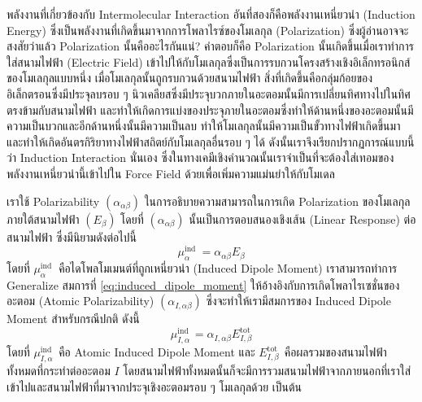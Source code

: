 พลังงานที่เกี่ยวข้องกับ Intermolecular Interaction อันที่สองก็คือพลังงานเหนี่ยวนำ (Induction Energy) ซึ่งเป็นพลังงานที่เกิดขึ้นมาจากการโพลาไรซ์ของโมเลกุล (Polarization) ซึ่งผู้อ่านอาจจะสงสัยว่าแล้ว Polarization นั้นคืออะไรกันแน่? คำตอบก็คือ Polarization นั้นเกิดขึ้นเมื่อเราทำการใส่สนามไฟฟ้า (Electric Field) เข้าไปให้กับโมเลกุลซึ่งเป็นการรบกวนโครงสร้างเชิงอิเล็กทรอนิกส์ของโมเลกุลแบบหนึ่ง เมื่อโมเลกุลนั้นถูกรบกวนด้วยสนามไฟฟ้า สิ่งที่เกิดขึ้นคือกลุ่มก้อยของอิเล็กตรอนซึ่งมีประจุลบรอบ ๆ นิวเคลียสซึ่งมีประจุบวกภายในอะตอมนั้นมีการเปลี่ยนทิศทางไปในทิศตรงข้ามกับสนามไฟฟ้า และทำให้เกิดการแบ่งของประจุภายในอะตอมซึ่งทำให้ด้านหนึ่งของอะตอมนั้นมีความเป็นบวกและอีกด้านหนึ่งนั้นมีความเป็นลบ ทำให้โมเลกุลนั้นมีความเป็นขั้วทางไฟฟ้าเกิดขึ้นมาและทำให้เกิดอันตรกิริยาทางไฟฟ้าสถิตย์กับโมเลกุลอื่นรอบ ๆ ได้ ดังนั้นเราจึงเรียกปรากฏการณ์แบบนี้ว่า Induction Interaction นั่นเอง ซึ่งในทางเคมีเชิงคำนวณนั้นเราจำเป็นที่จะต้องใส่เทอมของพลังงานเหนี่ยวนำนี้เข้าไปใน
Force Field ด้วยเพื่อเพิ่มความแม่นยำให้กับโมเดล

เราใช้ Polarizability $(\alpha_{\alpha \beta})$ ในการอธิบายความสามารถในการเกิด Polarization ของโมเลกุลภายใต้สนามไฟฟ้า $(E_{\beta})$ โดยที่ $(\alpha_{\alpha \beta})$ นั้นเป็นการตอบสนองเชิงเส้น (Linear Response) ต่อสนามไฟฟ้า ซึ่งมีนิยามดังต่อไปนี้
%
\begin{equation}
  \label{eq:induced_dipole_moment}
  \mu_\alpha^{\text{ind }}
  =
  \alpha_{\alpha \beta} E_\beta
\end{equation}
%
โดยที่ $\mu_\alpha^{\text{ind }}$ คือไดโพลโมเมนต์ที่ถูกเหนี่ยวนำ (Induced Dipole Moment) เราสามารถทำการ Generalize สมการที่ \eqref{eq:induced_dipole_moment} ให้อ้างอิงกับการเกิดโพลาไรเซชั่นของอะตอม (Atomic Polarizability) $(\alpha_{I, \alpha \beta})$ ซึ่งจะทำให้เรามีสมการของ Induced Dipole Moment สำหรับกรณีปกติ ดังนี้
%
\begin{equation}
  \mu_{I, \alpha}^{\text{ind }}
  =
  \alpha_{I, \alpha \beta} E_{I, \beta}^{\mathrm{tot}}
\end{equation}
%
โดยที่ $\mu_{I, \alpha}^{\text{ind }}$ คือ Atomic Induced Dipole Moment และ $E_{I, \beta}^{\text{tot }}$ คือผลรวมของสนามไฟฟ้าทั้งหมดที่กระทำต่ออะตอม $I$ โดยสนามไฟฟ้าทั้งหมดนั้นก็จะมีการรวมสนามไฟฟ้าจากภายนอกที่เราใส่เข้าไปและสนามไฟฟ้าที่มาจากประจุเชิงอะตอมรอบ ๆ โมเลกุลด้วย เป็นต้น

